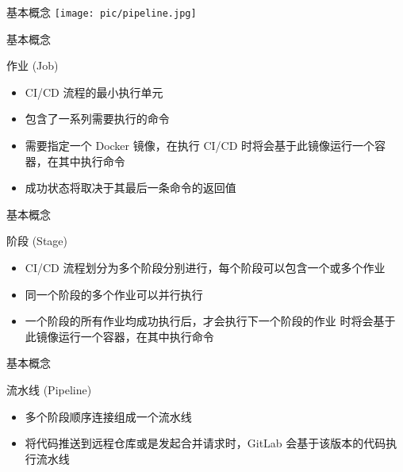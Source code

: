 \documentclass{beamer}
\begin{document}
\begin{frame}{基本概念}
\texttt{[image: pic/pipeline.jpg]}
\end{frame}

\begin{frame}{基本概念}
    \begin{block}{作业 (Job)}
        \begin{itemize}
            \item  CI/CD 流程的最小执行单元
            \item 包含了一系列需要执行的命令
            \item 需要指定一个 Docker 镜像，在执行 CI/CD 时将会基于此镜像运行一个容器，在其中执行命令
            \item 成功状态将取决于其最后一条命令的返回值
        \end{itemize}
    \end{block}
\end{frame}

\begin{frame}{基本概念}
    \begin{block}{阶段 (Stage)}
        \begin{itemize}
            \item CI/CD 流程划分为多个阶段分别进行，每个阶段可以包含一个或多个作业
            \item 同一个阶段的多个作业可以并行执行
            \item 一个阶段的所有作业均成功执行后，才会执行下一个阶段的作业 时将会基于此镜像运行一个容器，在其中执行命令
        \end{itemize}
    \end{block}
\end{frame}

\begin{frame}{基本概念}
    \begin{block}{流水线 (Pipeline)}
        \begin{itemize}
            \item 多个阶段顺序连接组成一个流水线
            \item 将代码推送到远程仓库或是发起合并请求时，GitLab 会基于该版本的代码执行流水线
        \end{itemize}
    \end{block}
\end{frame}
\end{document}
